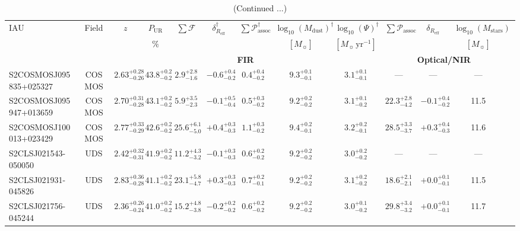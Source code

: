 \documentclass[a4paper, fleqn, usenatbib]{mnras}
\newcommand{\fidelity}{\mathcal{F}}
\newcommand{\mdust}{M_{\text{dust}}}
\newcommand{\msol}{M_{\sun}}
\newcommand{\mstars}{M_{\text{stars}}}
\newcommand{\reff}{R_{\text{eff}}}
\begin{document}
\addtocounter{table}{-1}

\begin{landscape}
\begin{table}
    \caption{(Continued ...)}
    \begin{tabular}{l c c c c c c c c c c c c}
        \hline
        IAU & Field & $z$ & $P_{\text{UR}}$ & $\sum\fidelity{}$ & $\delta_{\reff{}}^{\dagger}$ & $\sum\mathcal{P}_{\text{assoc}}^{\dagger}$ & $\log_{10}(\mdust{})^{\dagger}$ & $\log_{10}(\Psi)^{\dagger}$ & $\sum\mathcal{P}_{\text{assoc}}$ & $\delta_{\reff{}}$ & $\log_{10}(\mstars{})$\\
        & & & $\%$ & & & & $[\msol{}]$ & $[\msol{}\,\text{yr}^{-1}]$ & & & $[\msol{}]$\\
        & & \multicolumn{7}{c}{\dotfill\,\textbf{FIR}\,\dotfill} & \multicolumn{3}{c}{\dotfill\,\textbf{Optical/NIR}\,\dotfill}\\
        \hline
        S2COSMOSJ095835+025327 & COSMOS & $2.63^{+0.28}_{-0.26}$ & $43.8^{+0.2}_{-0.2}$ & $2.9^{+2.8}_{-1.6}$ & $-0.6^{+0.4}_{-0.2}$ & $0.4^{+0.4}_{-0.2}$ & $9.3^{+0.1}_{-0.1}$ & $3.1^{+0.1}_{-0.1}$ & --- & --- & ---\\
        S2COSMOSJ095947+013659 & COSMOS & $2.70^{+0.31}_{-0.28}$ & $43.1^{+0.2}_{-0.2}$ & $5.9^{+3.5}_{-2.3}$ & $-0.1^{+0.5}_{-0.4}$ & $0.5^{+0.3}_{-0.2}$ & $9.2^{+0.2}_{-0.2}$ & $3.1^{+0.1}_{-0.2}$ & $22.3^{+2.8}_{-4.2}$ & $-0.1^{+0.4}_{-0.2}$ & 11.5\\
        S2COSMOSJ100013+023429 & COSMOS & $2.77^{+0.33}_{-0.29}$ & $42.6^{+0.2}_{-0.2}$ & $25.6^{+6.1}_{-5.0}$ & $+0.4^{+0.3}_{-0.3}$ & $1.1^{+0.3}_{-0.2}$ & $9.4^{+0.2}_{-0.1}$ & $3.2^{+0.2}_{-0.1}$ & $28.5^{+3.3}_{-3.7}$ & $+0.3^{+0.4}_{-0.3}$ & 11.6\\
        S2CLSJ021543-050050 & UDS & $2.42^{+0.32}_{-0.31}$ & $41.9^{+0.2}_{-0.2}$ & $11.2^{+4.3}_{-3.2}$ & $-0.1^{+0.3}_{-0.3}$ & $0.6^{+0.2}_{-0.2}$ & $9.2^{+0.2}_{-0.2}$ & $3.0^{+0.2}_{-0.2}$ & --- & --- & ---\\
        S2CLSJ021931-045826 & UDS & $2.83^{+0.36}_{-0.28}$ & $41.1^{+0.2}_{-0.2}$ & $23.1^{+5.8}_{-4.7}$ & $+0.3^{+0.3}_{-0.3}$ & $0.7^{+0.2}_{-0.1}$ & $9.2^{+0.2}_{-0.2}$ & $3.1^{+0.2}_{-0.2}$ & $18.6^{+2.1}_{-2.1}$ & $+0.0^{+0.1}_{-0.1}$ & 11.5\\
        S2CLSJ021756-045244 & UDS & $2.36^{+0.26}_{-0.24}$ & $41.0^{+0.2}_{-0.2}$ & $15.2^{+4.8}_{-3.8}$ & $-0.2^{+0.2}_{-0.2}$ & $0.6^{+0.2}_{-0.2}$ & $9.2^{+0.2}_{-0.2}$ & $3.0^{+0.1}_{-0.2}$ & $29.8^{+3.4}_{-3.2}$ & $+0.0^{+0.1}_{-0.1}$ & 11.7\\

\end{tabular}
\end{table}
\end{landscape}
\end{document}
